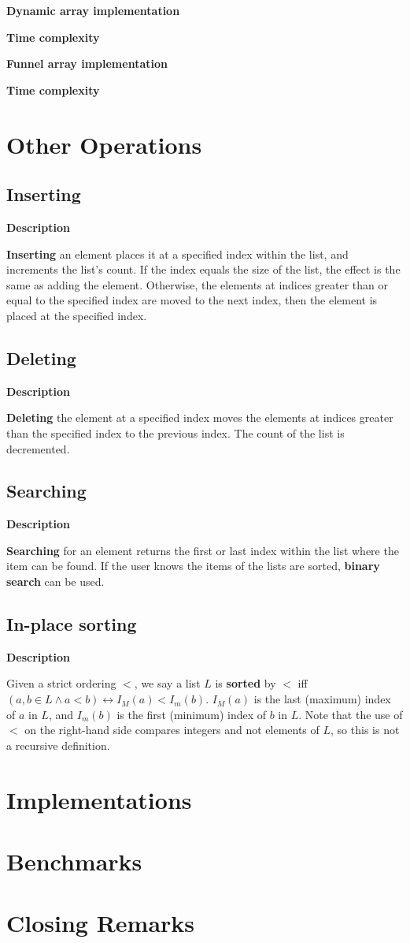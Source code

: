 \documentclass{article}
\newcommand{\descriptn}{\textbf{Description}}
\newcommand{\dynarrayimpl}{\textbf{Dynamic array implementation}}
\newcommand{\funarrayimpl}{\textbf{Funnel array implementation}}
\newcommand{\tcomplex}{\textbf{Time complexity}}
\newcommand{\listname}{L}
\begin{document}
	\dynarrayimpl
	
	\tcomplex
	
	\funarrayimpl
	
	\tcomplex
	
	\section{Other Operations}
	
	\subsection{Inserting}
	
	\descriptn
	
	\textbf{Inserting} an element places it at a specified index within the list, and increments the list's count. If the index equals the size of the list, the effect is the same as adding the element. Otherwise, the elements at indices greater than or equal to the specified index are moved to the next index, then the element is placed at the specified index.
	
	\subsection{Deleting}
	
	\descriptn
	
	\textbf{Deleting} the element at a specified index moves the elements at indices greater than the specified index to the previous index. The count of the list is decremented.
	
	\subsection{Searching}
	
	\descriptn
	
	\textbf{Searching} for an element returns the first or last index within the list where the item can be found. If the user knows the items of the lists are sorted, \textbf{binary search} can be used.
	
	\subsection{In-place sorting}
	
	\descriptn
	
	Given a strict ordering $<$, we say a list $\listname$ is \textbf{sorted} by $<$ iff $\left(a, b \in \listname \land a < b\right) \leftrightarrow I_M(a) < I_m(b)$. $I_M(a)$ is the last (maximum) index of $a$ in $L$, and $I_m(b)$ is the first (minimum) index of $b$ in $L$. Note that the use of $<$ on the right-hand side compares integers and not elements of $L$, so this is not a recursive definition.
	
	\section{Implementations}
	
	\section{Benchmarks}
	
	\section{Closing Remarks}
\end{document}

